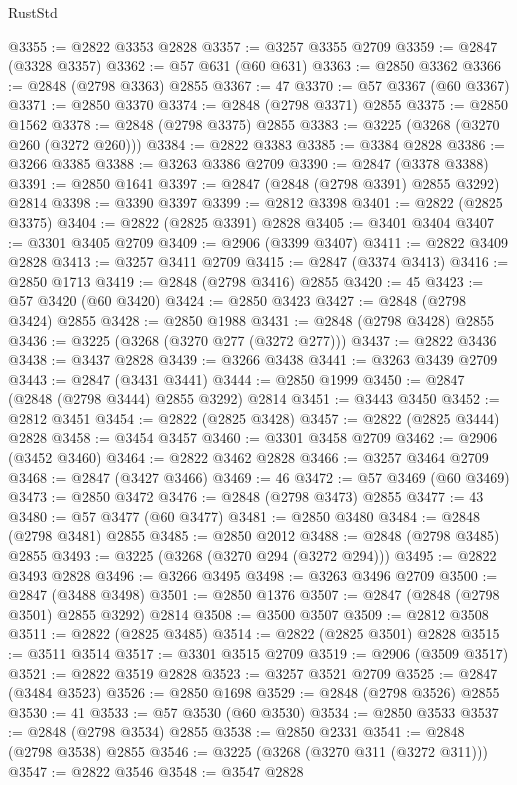 \begin{lexlean}{RustStd}
\begin{coremodule}
@3355 := @2822 @3353 @2828
@3357 := @3257 @3355 @2709
@3359 := @2847 (@3328 @3357)
@3362 := @57 @631 (@60 @631)
@3363 := @2850 @3362
@3366 := @2848 (@2798 @3363) @2855
@3367 := 47
@3370 := @57 @3367 (@60 @3367)
@3371 := @2850 @3370
@3374 := @2848 (@2798 @3371) @2855
@3375 := @2850 @1562
@3378 := @2848 (@2798 @3375) @2855
@3383 := @3225 (@3268 (@3270 @260 (@3272 @260)))
@3384 := @2822 @3383
@3385 := @3384 @2828
@3386 := @3266 @3385
@3388 := @3263 @3386 @2709
@3390 := @2847 (@3378 @3388)
@3391 := @2850 @1641
@3397 := @2847 (@2848 (@2798 @3391) @2855 @3292) @2814
@3398 := @3390 @3397
@3399 := @2812 @3398
@3401 := @2822 (@2825 @3375)
@3404 := @2822 (@2825 @3391) @2828
@3405 := @3401 @3404
@3407 := @3301 @3405 @2709
@3409 := @2906 (@3399 @3407)
@3411 := @2822 @3409 @2828
@3413 := @3257 @3411 @2709
@3415 := @2847 (@3374 @3413)
@3416 := @2850 @1713
@3419 := @2848 (@2798 @3416) @2855
@3420 := 45
@3423 := @57 @3420 (@60 @3420)
@3424 := @2850 @3423
@3427 := @2848 (@2798 @3424) @2855
@3428 := @2850 @1988
@3431 := @2848 (@2798 @3428) @2855
@3436 := @3225 (@3268 (@3270 @277 (@3272 @277)))
@3437 := @2822 @3436
@3438 := @3437 @2828
@3439 := @3266 @3438
@3441 := @3263 @3439 @2709
@3443 := @2847 (@3431 @3441)
@3444 := @2850 @1999
@3450 := @2847 (@2848 (@2798 @3444) @2855 @3292) @2814
@3451 := @3443 @3450
@3452 := @2812 @3451
@3454 := @2822 (@2825 @3428)
@3457 := @2822 (@2825 @3444) @2828
@3458 := @3454 @3457
@3460 := @3301 @3458 @2709
@3462 := @2906 (@3452 @3460)
@3464 := @2822 @3462 @2828
@3466 := @3257 @3464 @2709
@3468 := @2847 (@3427 @3466)
@3469 := 46
@3472 := @57 @3469 (@60 @3469)
@3473 := @2850 @3472
@3476 := @2848 (@2798 @3473) @2855
@3477 := 43
@3480 := @57 @3477 (@60 @3477)
@3481 := @2850 @3480
@3484 := @2848 (@2798 @3481) @2855
@3485 := @2850 @2012
@3488 := @2848 (@2798 @3485) @2855
@3493 := @3225 (@3268 (@3270 @294 (@3272 @294)))
@3495 := @2822 @3493 @2828
@3496 := @3266 @3495
@3498 := @3263 @3496 @2709
@3500 := @2847 (@3488 @3498)
@3501 := @2850 @1376
@3507 := @2847 (@2848 (@2798 @3501) @2855 @3292) @2814
@3508 := @3500 @3507
@3509 := @2812 @3508
@3511 := @2822 (@2825 @3485)
@3514 := @2822 (@2825 @3501) @2828
@3515 := @3511 @3514
@3517 := @3301 @3515 @2709
@3519 := @2906 (@3509 @3517)
@3521 := @2822 @3519 @2828
@3523 := @3257 @3521 @2709
@3525 := @2847 (@3484 @3523)
@3526 := @2850 @1698
@3529 := @2848 (@2798 @3526) @2855
@3530 := 41
@3533 := @57 @3530 (@60 @3530)
@3534 := @2850 @3533
@3537 := @2848 (@2798 @3534) @2855
@3538 := @2850 @2331
@3541 := @2848 (@2798 @3538) @2855
@3546 := @3225 (@3268 (@3270 @311 (@3272 @311)))
@3547 := @2822 @3546
@3548 := @3547 @2828

\end{coremodule}
\end{lexlean}

